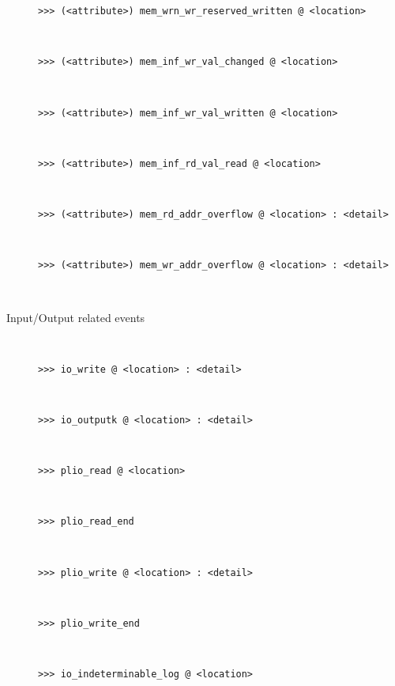 \begin{description}
\begin{description}
                    \item[\texttt{>{}>{}> (<attribute>) mem\_wrn\_wr\_reserved\_written @ <location>}]~\\
                    \item[\texttt{>{}>{}> (<attribute>) mem\_inf\_wr\_val\_changed @ <location>}]~\\
                    \item[\texttt{>{}>{}> (<attribute>) mem\_inf\_wr\_val\_written @ <location>}]~\\
                    \item[\texttt{>{}>{}> (<attribute>) mem\_inf\_rd\_val\_read @ <location>}]~\\
                    \item[\texttt{>{}>{}> (<attribute>) mem\_rd\_addr\_overflow @ <location> : <detail>}]~\\
                    \item[\texttt{>{}>{}> (<attribute>) mem\_wr\_addr\_overflow @ <location> : <detail>}]~\\
                \end{description}

            \item[Input/Output related events]~\\
                \begin{description}
                    \item[\texttt{>{}>{}> io\_write @ <location> : <detail>}]~\\
                    \item[\texttt{>{}>{}> io\_outputk @ <location> : <detail>}]~\\
                    \item[\texttt{>{}>{}> plio\_read @ <location>}]~\\
                    \item[\texttt{>{}>{}> plio\_read\_end}]~\\
                    \item[\texttt{>{}>{}> plio\_write @ <location> : <detail>}]~\\
                    \item[\texttt{>{}>{}> plio\_write\_end}]~\\
                    \item[\texttt{>{}>{}> io\_indeterminable\_log @ <location>}]~\\
                \end{description}
        \end{description}

